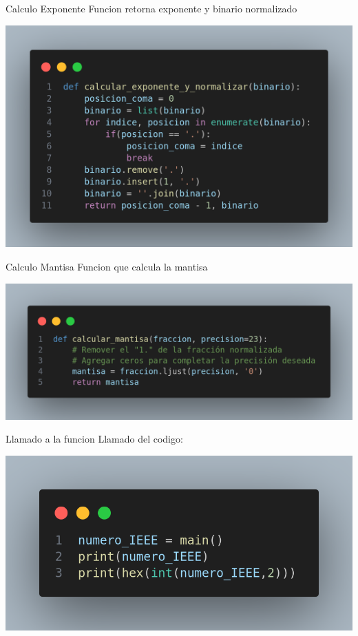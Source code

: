 \documentclass[presentation]{beamer}
\begin{document}
\begin{frame}[label={sec:org4fb1597}]{Calculo Exponente}
Funcion retorna exponente y binario normalizado

\begin{center}
\includegraphics[width=.9\linewidth]{./img_codigo/calculo_exponente.png}
\end{center}
\end{frame}

\begin{frame}[label={sec:orgcc64585}]{Calculo Mantisa}
Funcion que calcula la mantisa
\begin{center}
\includegraphics[width=.9\linewidth]{./img_codigo/calculo_mantisa.png}
\end{center} 
\end{frame}

\begin{frame}[label={sec:orgdeb9c15}]{Llamado a la funcion}
Llamado del codigo:

\begin{center}
\includegraphics[width=.9\linewidth]{./img_codigo/llamado_funcion.png}
\end{center}
\end{frame}
\end{document}
